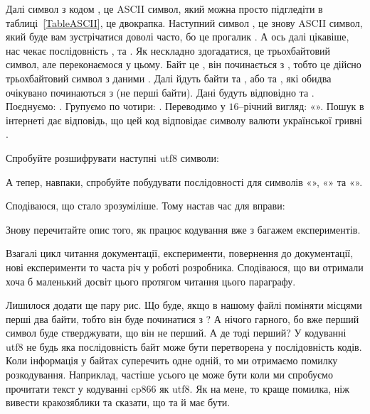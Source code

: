 Далі символ з кодом , це ASCII символ, який можна просто підгледіти в таблиці~\ref{TableASCII}, це двокрапка.
Наступний символ , це знову ASCII символ, який буде вам зустрічатися доволі часто, бо це прогалик \chr{\s}.
А ось далі цікавіше, нас чекає послідовність ,  та .
Як нескладно здогадатися, це трьохбайтовий символ, але переконаємося у цьому.
Байт  це , він починається з , тобто це дійсно трьохбайтовий символ з даними .
Далі йдуть байти  та , або  та , які обидва очікувано починаються з  (не перші байти).
Дані будуть відповідно  та .
Поєднуємо: .
Групуємо по чотири: .
Переводимо у $16$--річний вигляд: «».
Пошук в інтернеті дає відповідь, що цей код відповідає символу валюти української гривні .

\begin{exercise}
Спробуйте розшифрувати наступні utf8 символи:
\end{exercise}

\begin{exercise}
А тепер, навпаки, спробуйте побудувати  послідовності для символів «», «» та «».
\end{exercise}

Сподіваюся, що стало зрозуміліше.
Тому настав час для вправи:

\begin{exercise}
Знову перечитайте опис того, як працює кодування  вже з багажем експериментів.
\end{exercise}

Взагалі цикл читання документації, експерименти, повернення до документації, нові експерименти то часта річ у роботі розробника.
Сподіваюся, що ви отримали хоча б маленький досвіт цього протягом читання цього параграфу.

\medskip

Лишилося додати ще пару рис.
Що буде, якщо в нашому файлі поміняти місцями перші два байти, тобто він буде починатися з ?
А нічого гарного, бо вже перший символ буде стверджувати, що він не перший.
А де тоді перший?
У кодуванні utf8 не будь яка послідовність байт може бути перетворена у послідовність кодів.
Коли інформація у байтах суперечить одне одній, то ми отримаємо помилку розкодування.
Наприклад, частіше усього це може бути коли ми спробуємо прочитати текст у кодуванні cp866 як utf8.
Як на мене, то краще помилка, ніж вивести кракозяблики та сказати, що та й має бути.

